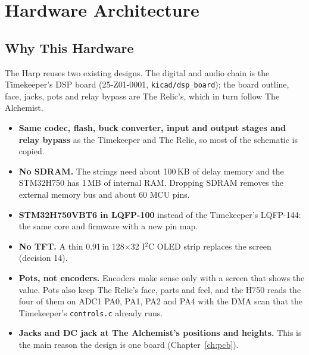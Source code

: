 \chapter{Hardware Architecture}\label{ch:architecture}

\section{Why This Hardware}
The Harp reuses two existing designs. The digital and audio chain is the Timekeeper's DSP board (25-Z01-0001, \texttt{kicad/dsp\_board}); the board outline, face, jacks, pots and relay bypass are The Relic's, which in turn follow The Alchemist.

\begin{itemize}
  \item \textbf{Same codec, flash, buck converter, input and output stages and relay bypass} as the Timekeeper and The Relic, so most of the schematic is copied.
  \item \textbf{No SDRAM.} The strings need about 100\,KB of delay memory and the STM32H750 has 1\,MB of internal RAM. Dropping SDRAM removes the external memory bus and about 60 MCU pins.
  \item \textbf{STM32H750VBT6 in LQFP-100} instead of the Timekeeper's LQFP-144: the same core and firmware with a new pin map.
  \item \textbf{No TFT.} A thin 0.91\,in 128$\times$32 I$^2$C OLED strip replaces the screen (decision 14).
  \item \textbf{Pots, not encoders.} Encoders make sense only with a screen that shows the value. Pots also keep The Relic's face, parts and feel, and the H750 reads the four of them on ADC1 PA0, PA1, PA2 and PA4 with the DMA scan that the Timekeeper's \texttt{controls.c} already runs.
  \item \textbf{Jacks and DC jack at The Alchemist's positions and heights.} This is the main reason the design is one board (Chapter~\ref{ch:pcb}).
\end{itemize}

